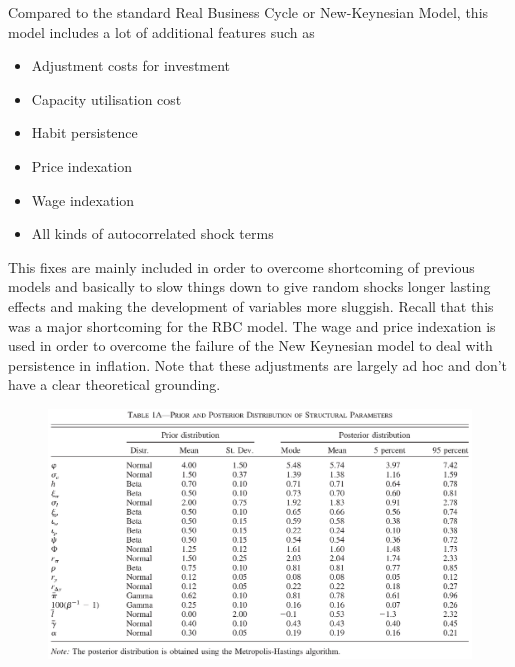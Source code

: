\documentclass{beamer}
\begin{document}
\begin{frame}
  Compared to the standard Real Business Cycle or New-Keynesian Model, this model includes a lot of additional features such as
\begin{itemize}
  \item Adjustment costs for investment
  \item Capacity utilisation cost
  \item Habit persistence
  \item Price indexation
  \item Wage indexation
  \item All kinds of autocorrelated shock terms
\end{itemize}
This fixes are mainly included in order to overcome shortcoming of previous models and basically to slow things down to give random shocks longer lasting effects and making the development of variables more sluggish.
Recall that this was a major shortcoming for the RBC model.
The wage and price indexation is used in order to overcome the failure of the New Keynesian model to deal with persistence in inflation.
Note that these adjustments are largely ad hoc and don't have a clear theoretical grounding. 
\end{frame}

\begin{frame}
  \begin{figure}
     \includegraphics{sw_table1.eps}
   \end{figure} 
\end{frame}
\end{document}
